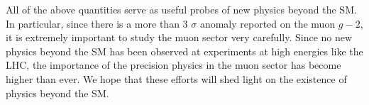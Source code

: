 All of the above quantities serve as useful probes of new
physics beyond the SM.  In particular, since there is a
more than 3 $\sigma$ anomaly reported on the muon $g-2$,
it is extremely important to study the muon sector very 
carefully.  Since no new physics beyond the
SM has been observed at experiments at high energies 
like the LHC, the importance of the precision physics 
in the muon sector has become higher than ever.  We hope that
these efforts will shed light on the existence of physics
beyond the SM.
















 






